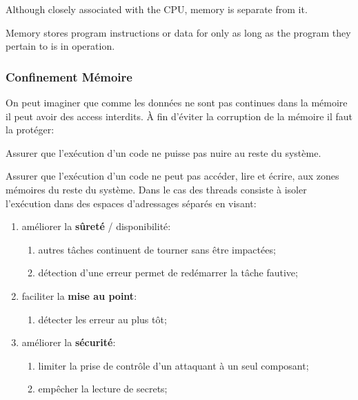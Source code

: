 \documentclass{article}
\begin{document}
\begin{definition}
    \begin{remark}
        Although closely associated with the CPU, memory is separate from it.
    \end{remark}
    
    \begin{remark}
        Memory stores program instructions or data for only as long as the program they pertain to is in operation.
    \end{remark}
\end{definition}


\subsubsection{Confinement Mémoire}
On peut imaginer que comme les données ne sont pas continues dans la mémoire il peut avoir des access interdits. À fin d'éviter la corruption de la mémoire il faut la protéger:
\begin{definition}
    Assurer que l'exécution d'un code ne puisse pas nuire au reste du système.
\end{definition}
Assurer que l'exécution d'un code ne peut pas accéder, lire et écrire, aux zones mémoires du reste du système. Dans le cas des threads consiste à isoler l'exécution dans des espaces d'adressages séparés en visant:
\begin{enumerate}[noitemsep]
    \item améliorer la \textbf{sûreté} / disponibilité:
    \begin{enumerate}[noitemsep]
        \item autres tâches continuent de tourner sans être impactées;
        \item détection d'une erreur permet de redémarrer la tâche fautive;
    \end{enumerate}
    
    \item faciliter la \textbf{mise au point}:
    \begin{enumerate}[noitemsep]
        \item détecter les erreur au plus tôt;
    \end{enumerate}
    
    \item améliorer la \textbf{sécurité}:
    \begin{enumerate}[noitemsep]
        \item limiter la prise de contrôle d'un attaquant à un seul composant;
        \item empêcher la lecture de secrets;
    \end{enumerate}
\end{enumerate}
\end{document}
